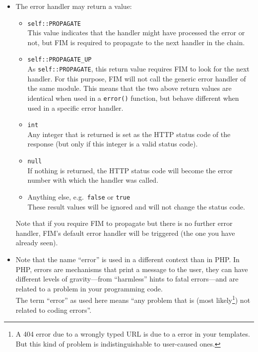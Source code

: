 \documentclass{scrartcl}
\begin{document}
\begin{itemize}
         \item
            The error handler may return a value:
            \begin{itemize}
               \item \lstinline!self::PROPAGATE! \\
                  This value indicates that the handler might have processed the error or not, but FIM is required to propagate to the next handler in the chain.
               \item \lstinline!self::PROPAGATE_UP! \\
                  As \lstinline!self::PROPAGATE!, this return value requires FIM to look for the next handler. For this purpose, FIM will not call the generic error handler of the same module. This means that the two above return values are identical when used in a \lstinline!error()! function, but behave different when used in a specific error handler.
               \item \lstinline!int! \\
                  Any integer that is returned is set as the HTTP status code of the response (but only if this integer is a valid status code).
               \item \lstinline!null! \\
                  If nothing is returned, the HTTP status code will become the error number with which the handler was called.
               \item Anything else, e.g.\ \lstinline!false! or \lstinline!true! \\
                  These result values will be ignored and will not change the status code.
            \end{itemize}
            Note that if you require FIM to propagate but there is no further error handler, FIM's default error handler will be triggered (the one you have already seen).
         \item
            Note that the name ``error'' is used in a different context than in PHP. In PHP, errors are mechanisms that print a message to the user, they can have different levels of gravity---from ``harmless'' hints to fatal errors---and are related to a problem in your programming code. \\
            The term ``error'' as used here means ``any problem that is (most likely\footnote{A 404 error due to a wrongly typed URL is due to a error in your templates. But this kind of problem is indistinguishable to user-caused ones.}) not related to coding errors''. \\

\end{itemize}
\end{document}
